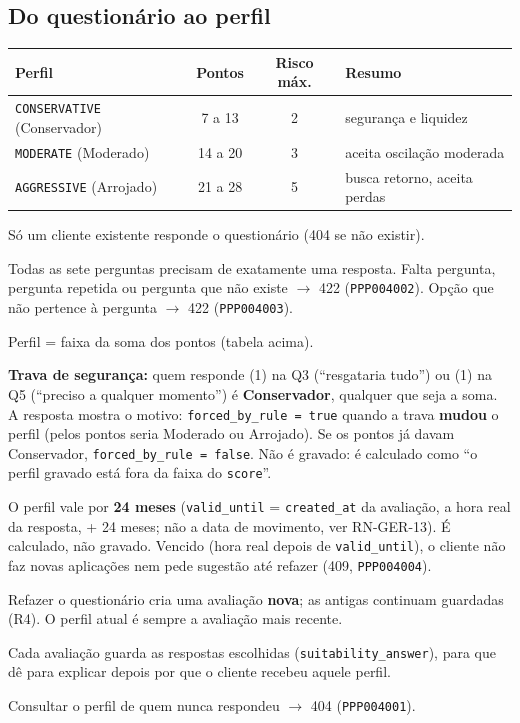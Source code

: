 \documentclass[11pt,a4paper]{article}
\newcommand{\obr}{\textbf{[OBR]}}          %
\newcommand{\dec}{\textbf{[DEC]}}          %
\newcommand{\tb}[1]{\texttt{#1}}           %
\begin{document}
\subsection{Do questionário ao perfil}

\begin{center}
\begin{tabular}{@{}lccl@{}}
\toprule
\textbf{Perfil} & \textbf{Pontos} & \textbf{Risco máx.} & \textbf{Resumo} \\
\midrule
\tb{CONSERVATIVE} (Conservador) & 7 a 13 & 2 & segurança e liquidez \\
\tb{MODERATE} (Moderado) & 14 a 20 & 3 & aceita oscilação moderada \\
\tb{AGGRESSIVE} (Arrojado) & 21 a 28 & 5 & busca retorno, aceita perdas \\
\bottomrule
\end{tabular}
\end{center}

\begin{regras}
  \item[RN-SUI-01 \obr] Só um cliente existente responde o questionário (404 se não existir).
  \item[RN-SUI-02 \obr] Todas as sete perguntas precisam de exatamente uma resposta. Falta pergunta,
  pergunta repetida ou pergunta que não existe $\to$ 422 (\tb{PPP004002}). Opção que não pertence
  à pergunta $\to$ 422 (\tb{PPP004003}).
  \item[RN-SUI-03 \dec] Perfil = faixa da soma dos pontos (tabela acima).
  \item[RN-SUI-04 \dec] \textbf{Trava de segurança:} quem responde (1) na Q3 (``resgataria tudo'')
  ou (1) na Q5 (``preciso a qualquer momento'') é \textbf{Conservador}, qualquer que seja a soma. A
  resposta mostra o motivo: \tb{forced_by_rule = true} quando a trava \textbf{mudou} o perfil (pelos
  pontos seria Moderado ou Arrojado). Se os pontos já davam Conservador, \tb{forced_by_rule = false}.
  Não é gravado: é calculado como ``o perfil gravado está fora da faixa do \tb{score}''.
  \item[RN-SUI-05 \dec] O perfil vale por \textbf{24 meses} (\tb{valid_until} = \tb{created_at} da
  avaliação, a hora real da resposta, + 24 meses; não a data de movimento, ver RN-GER-13). É
  calculado, não gravado. Vencido (hora real depois de \tb{valid_until}), o cliente não faz novas
  aplicações nem pede sugestão até refazer (409, \tb{PPP004004}).
  \item[RN-SUI-06 \obr] Refazer o questionário cria uma avaliação \textbf{nova}; as antigas continuam
  guardadas (R4). O perfil atual é sempre a avaliação mais recente.
  \item[RN-SUI-07 \dec] Cada avaliação guarda as respostas escolhidas (\tb{suitability_answer}),
  para que dê para explicar depois por que o cliente recebeu aquele perfil.
  \item[RN-SUI-08 \dec] Consultar o perfil de quem nunca respondeu $\to$ 404 (\tb{PPP004001}).
\end{regras}
\end{document}
